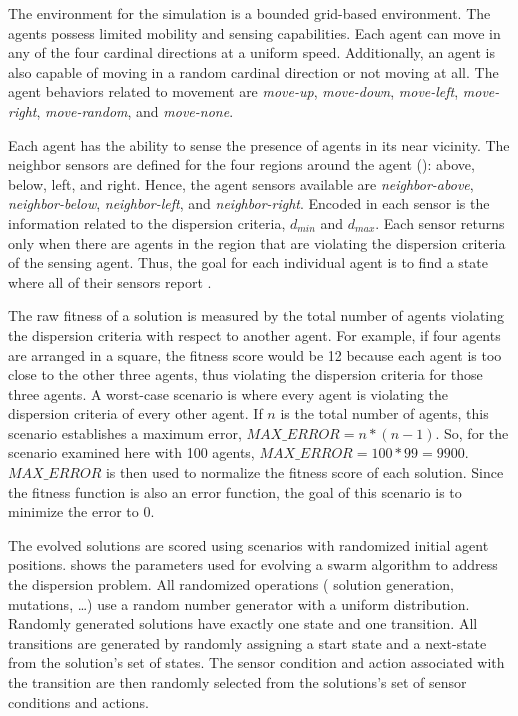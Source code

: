 The environment for the simulation is a bounded grid-based environment.  The agents possess limited mobility and sensing capabilities.  Each agent can move in any of the four cardinal directions at a uniform speed.  Additionally, an agent is also capable of moving in a random cardinal direction or not moving at all.  The agent behaviors related to movement are \emph{move-up}, \emph{move-down}, \emph{move-left}, \emph{move-right}, \emph{move-random}, and \emph{move-none}.


Each agent has the ability to sense the presence of agents in its near vicinity.  The neighbor sensors are defined for the four regions around the agent (): above, below, left, and right.  Hence, the agent sensors available  are \emph{neighbor-above}, \emph{neighbor-below}, \emph{neighbor-left}, and \emph{neighbor-right}.  Encoded in each sensor is the information related to the dispersion criteria, \ie{} $d_{min}$ and $d_{max}$.  Each sensor returns \true{} only when there are agents in the region that are violating the dispersion criteria of the sensing agent.  Thus, the goal for each individual agent is to find a state where all of their sensors report \false{}.

The raw fitness of a solution is measured by the total number of agents violating the dispersion criteria with respect to another agent.  For example, if four agents are arranged in a square, the fitness score would be 12 because each agent is too close to the other three agents, thus violating the dispersion criteria for those three agents.  A worst-case scenario is where every agent is violating the dispersion criteria of every other agent.  If $n$ is the total number of agents, this scenario establishes a maximum error, $MAX\_ERROR = n*(n-1)$.  So, for the scenario examined here with 100 agents, $MAX\_ERROR = 100*99 = 9900$.  $MAX\_ERROR$ is then used to normalize the fitness score of each solution.  Since the fitness function is also an error function, the goal of this scenario is to minimize the error to 0.

The evolved solutions are scored using scenarios with randomized initial agent positions.   shows the parameters used for evolving a swarm algorithm to address the dispersion problem.  All randomized operations (\ie{} solution generation, mutations, \ldots) use a random number generator with a uniform distribution.  Randomly generated solutions have exactly one state and one transition.  All transitions are generated by randomly assigning a start state and a next-state from the solution's set of states.  The sensor condition and action associated with the transition are then randomly selected from the solutions's set of sensor conditions and actions.

